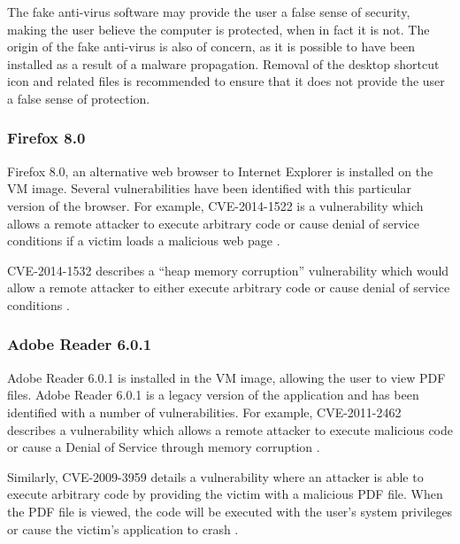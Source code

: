 The fake anti-virus software may provide the user a false sense of security, making the user believe the computer is protected, when in fact it is not. The origin of the fake anti-virus is also of concern, as it is possible to have been installed as a result of a malware propagation. Removal of the desktop shortcut icon and related files is recommended to ensure that it does not provide the user a false sense of protection.

\subsubsection{Firefox 8.0}

Firefox 8.0, an alternative web browser to Internet Explorer is installed on the VM image. Several vulnerabilities have been identified with this particular version of the browser. For example, CVE-2014-1522 is a vulnerability which allows a remote attacker to execute arbitrary code or cause denial of service conditions if a victim loads a malicious web page \citep{MITRE2014b}.

CVE-2014-1532 describes a ``heap memory corruption'' vulnerability which would allow a remote attacker to either execute arbitrary code or cause denial of service conditions \citep{MITRE2014a}.

\subsubsection{Adobe Reader 6.0.1}

Adobe Reader 6.0.1 is installed in the VM image, allowing the user to view PDF files. Adobe Reader 6.0.1 is a legacy version of the application and has been identified with a number of vulnerabilities. For example, CVE-2011-2462 describes a vulnerability which allows a remote attacker to execute malicious code or cause a Denial of Service through memory corruption \citep{Adobe2011}.

Similarly, CVE-2009-3959 details a vulnerability where an attacker is able to execute arbitrary code by providing the victim with a malicious PDF file. When the PDF file is viewed, the code will be executed with the user's system privileges or cause the victim's application to crash \citep{SecurityFocus2010, SecurityTracker2010}.


